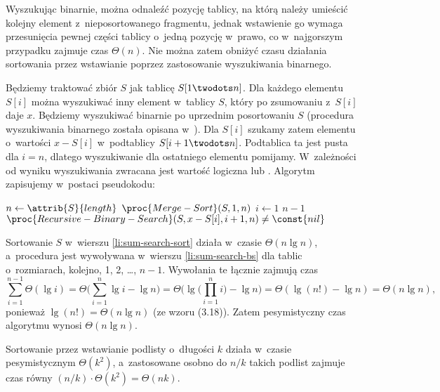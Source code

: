 \exercise %
Wyszukując binarnie, można odnaleźć pozycję tablicy, na którą należy umieścić kolejny element z~nieposortowanego fragmentu, jednak wstawienie go wymaga przesunięcia pewnej części tablicy o~jedną pozycję w~prawo, co w~najgorszym przypadku zajmuje czas $\Theta(n)$.
Nie można zatem obniżyć czasu działania sortowania przez wstawianie poprzez zastosowanie wyszukiwania binarnego.

\exercise %
Będziemy traktować zbiór $S$ jak tablicę $S[1\twodots n]$.
Dla każdego elementu $S[i]$ można wyszukiwać inny element w~tablicy $S$, który po zsumowaniu z~$S[i]$ daje $x$.
Będziemy wyszukiwać binarnie po uprzednim posortowaniu $S$ (procedura wyszukiwania binarnego została opisana w~).
Dla $S[i]$ szukamy zatem elementu o~wartości $x-S[i]$ w~podtablicy $S[i+1\twodots n]$.
Podtablica ta jest pusta dla $i=n$, dlatego wyszukiwanie dla ostatniego elementu pomijamy.
W~zależności od wyniku wyszukiwania zwracana jest wartość logiczna  lub .
Algorytm zapisujemy w~postaci pseudokodu:
\begin{codebox}
\li	$n\gets\attrib{S}{length}$
\li	$\proc{Merge-Sort}(S,1,n)$ \label{li:sum-search-sort}
\li	\For $i\gets1$ \To $n-1$
\li		\Do
			\If $\proc{Recursive-Binary-Search}(S,x-S[i],i+1,n)\ne\const{nil}$ \label{li:sum-search-bs}
\li				\Then \Return {}
				\End
		\End
\li	\Return {}
\end{codebox}

Sortowanie $S$ w~wierszu \ref{li:sum-search-sort} działa w~czasie $\Theta(n\lg n)$, a~procedura  jest wywoływana w~wierszu \ref{li:sum-search-bs} dla tablic o~rozmiarach, kolejno, 1, 2, \dots, $n-1$.
Wywołania te łącznie zajmują czas
\[
	\sum_{i=1}^{n-1}\Theta(\lg i) = \Theta\biggl(\sum_{i=1}^n\lg i-\lg n\biggr) = \Theta\biggl(\lg\biggl(\prod_{i=1}^ni\biggr)-\lg n\biggr) = \Theta(\lg(n!)-\lg n) = \Theta(n\lg n),
\]
ponieważ $\lg(n!)=\Theta(n\lg n)$ (ze wzoru (3.18)).
Zatem pesymistyczny czas algorytmu  wynosi $\Theta(n\lg n)$.

\problems


\subproblem %
Sortowanie przez wstawianie podlisty o~długości $k$ działa w~czasie pesymistycznym $\Theta(k^2)$, a~zastosowane osobno do $n/k$ takich podlist zajmuje czas równy $(n/k)\cdot\Theta(k^2)=\Theta(nk)$.

